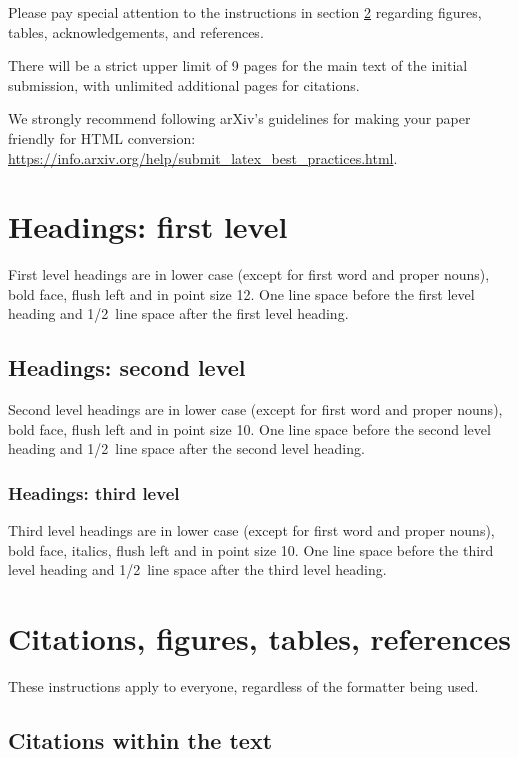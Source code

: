 \documentclass{article} %
\begin{document}
Please pay special attention to the instructions in section \ref{others}
regarding figures, tables, acknowledgements, and references.


There will be a strict upper limit of 9 pages for the main text of the initial submission, with unlimited additional pages for citations. 

We strongly recommend following arXiv's guidelines for making your paper friendly for HTML conversion: \url{https://info.arxiv.org/help/submit_latex_best_practices.html}.


\section{Headings: first level}
\label{headings}

First level headings are in lower case (except for first word and proper nouns), bold face,
flush left and in point size 12. One line space before the first level
heading and 1/2~line space after the first level heading.

\subsection{Headings: second level}

Second level headings are in lower case (except for first word and proper nouns), bold face,
flush left and in point size 10. One line space before the second level
heading and 1/2~line space after the second level heading.

\subsubsection{Headings: third level}

Third level headings are in lower case (except for first word and proper nouns), bold face, italics, 
flush left and in point size 10. One line space before the third level
heading and 1/2~line space after the third level heading.

\section{Citations, figures, tables, references}\label{others}

These instructions apply to everyone, regardless of the formatter being used.

\subsection{Citations within the text}
\end{document}
